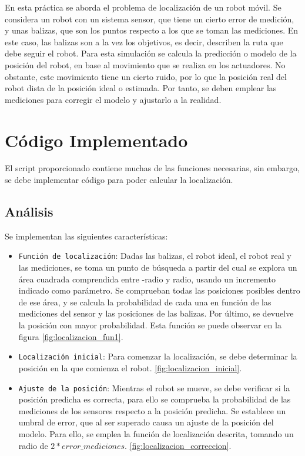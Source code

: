 En esta práctica se aborda el problema de localización de un robot móvil. Se considera un robot con un sistema sensor, que tiene un cierto error de medición, y unas balizas, que son los puntos respecto a los que se toman las mediciones. 
En este caso, las balizas son a la vez los objetivos, es decir, describen la ruta que debe seguir el robot. Para esta simulación se calcula la predicción o modelo de la posición del robot, en base al movimiento que se realiza en los actuadores. 
No obstante, este movimiento tiene un cierto ruido, por lo que la posición real del robot dista de la posición ideal o estimada. Por tanto, se deben emplear las mediciones para corregir el modelo y ajustarlo a la realidad.


\section{Código Implementado}
El script proporcionado contiene muchas de las funciones necesarias, sin embargo, se debe implementar código para poder calcular la localización.

\subsection{Análisis}
Se implementan las siguientes características:
\begin{itemize}
  \item \texttt{Función de localización}: Dadas las balizas, el robot ideal, el robot real y las mediciones, se toma un punto de búsqueda a partir del cual se explora un área cuadrada comprendida entre -radio y radio, 
  usando un incremento indicado como parámetro. Se comprueban todas las posiciones posibles dentro de ese área, y se calcula la probabilidad de cada una en función de las mediciones del sensor y las posiciones de las balizas.
  Por último, se devuelve la posición con mayor probabilidad. Esta función se puede observar en la figura \ref{fig:localizacion_fun1}.
  \item \texttt{Localización inicial}: Para comenzar la localización, se debe determinar la posición en la que comienza el robot. \ref{fig:localizacion_inicial}.
  \item \texttt{Ajuste de la posición}: Mientras el robot se mueve, se debe verificar si la posición predicha es correcta, para ello se comprueba la probabilidad de las mediciones de los sensores respecto a la posición predicha.
  Se establece un umbral de error, que al ser superado causa un ajuste de la posición del modelo. Para ello, se emplea la función de localización descrita, tomando un radio de $2*error\_mediciones$. \ref{fig:localizacion_correccion}.
\end{itemize}

